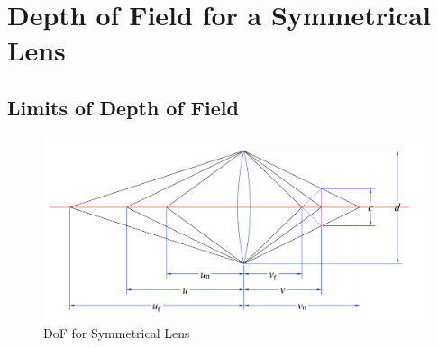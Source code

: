 \documentclass[11pt, oneside]{scrartcl}   	%
\begin{document}
\section{Depth of Field for a Symmetrical Lens }
\label{sec:depth-field-symm}

\subsection{Limits of Depth of Field}
\label{sec:limits-depth-field}

\begin{figure}[htbp] %
   \centering
   \includegraphics[width=\linewidth]{figure/fig_dofd_1} 
   \caption{DoF for Symmetrical Lens}
   \label{fig:symlens}
\end{figure}
\end{document}
